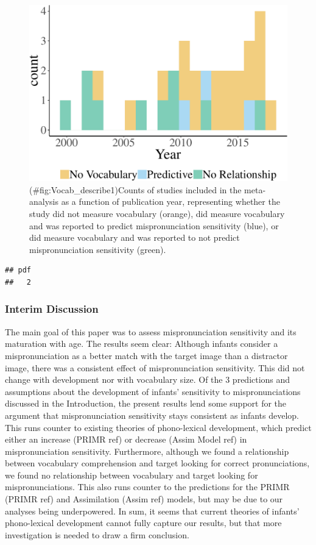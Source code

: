 \documentclass[man]{apa6}
\theoremstyle{definition}
\theoremstyle{definition}
\theoremstyle{definition}
\theoremstyle{remark}
\begin{document}
\begin{figure}
\centering
\includegraphics{Paper_Analyses_files/figure-latex/Vocab_describe1-1.pdf}
\caption{(\#fig:Vocab\_describe1)Counts of studies included in the
meta-analysis as a function of publication year, representing whether
the study did not measure vocabulary (orange), did measure vocabulary
and was reported to predict mispronunciation sensitivity (blue), or did
measure vocabulary and was reported to not predict mispronunciation
sensitivity (green).}
\end{figure}

\begin{verbatim}
## pdf 
##   2
\end{verbatim}

\subsubsection{Interim Discussion}\label{interim-discussion}

The main goal of this paper was to assess mispronunciation sensitivity
and its maturation with age. The results seem clear: Although infants
consider a mispronunciation as a better match with the target image than
a distractor image, there was a consistent effect of mispronunciation
sensitivity. This did not change with development nor with vocabulary
size. Of the 3 predictions and assumptions about the development of
infants' sensitivity to mispronunciations discussed in the Introduction,
the present results lend some support for the argument that
mispronunciation sensitivity stays consistent as infants develop. This
runs counter to existing theories of phono-lexical development, which
predict either an increase (PRIMR ref) or decrease (Assim Model ref) in
mispronunciation sensitivity. Furthermore, although we found a
relationship between vocabulary comprehension and target looking for
correct pronunciations, we found no relationship between vocabulary and
target looking for mispronunciations. This also runs counter to the
predictions for the PRIMR (PRIMR ref) and Assimilation (Assim ref)
models, but may be due to our analyses being underpowered. In sum, it
seems that current theories of infants' phono-lexical development cannot
fully capture our results, but that more investigation is needed to draw
a firm conclusion.
\end{document}
